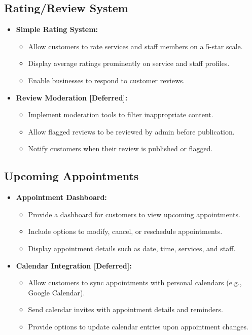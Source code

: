 \subsection{Rating/Review System}
\begin{itemize}[leftmargin=*]
    \item \textbf{Simple Rating System:}
    \begin{itemize}
        \item Allow customers to rate services and staff members on a 5-star scale.
        \item Display average ratings prominently on service and staff profiles.
        \item Enable businesses to respond to customer reviews.
    \end{itemize}
    
    \item \textbf{Review Moderation [Deferred]:}
    \begin{itemize}
        \item Implement moderation tools to filter inappropriate content.
        \item Allow flagged reviews to be reviewed by admin before publication.
        \item Notify customers when their review is published or flagged.
    \end{itemize}
\end{itemize}

\subsection{Upcoming Appointments}
\begin{itemize}[leftmargin=*]
    \item \textbf{Appointment Dashboard:}
    \begin{itemize}
        \item Provide a dashboard for customers to view upcoming appointments.
        \item Include options to modify, cancel, or reschedule appointments.
        \item Display appointment details such as date, time, services, and staff.
    \end{itemize}
    
    \item \textbf{Calendar Integration [Deferred]:}
    \begin{itemize}
        \item Allow customers to sync appointments with personal calendars (e.g., Google Calendar).
        \item Send calendar invites with appointment details and reminders.
        \item Provide options to update calendar entries upon appointment changes.
    \end{itemize}
\end{itemize}
